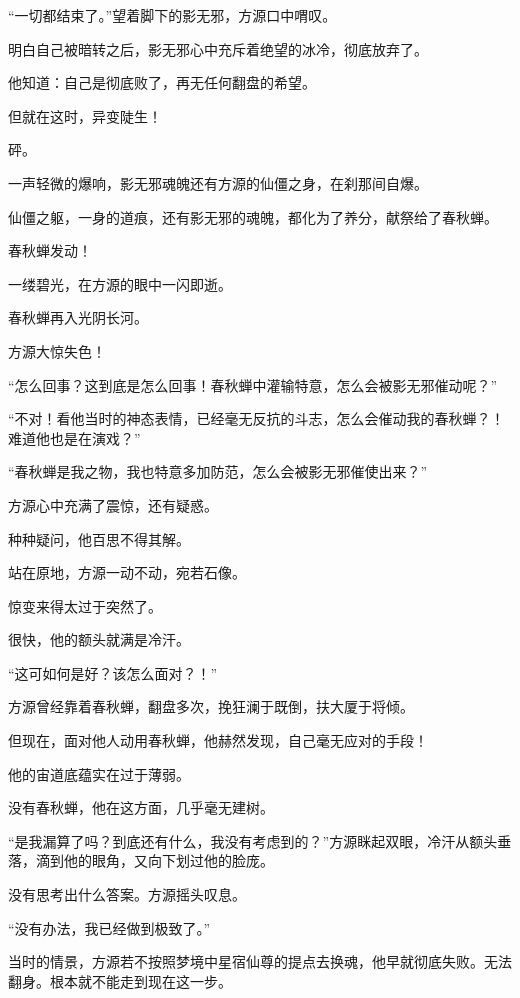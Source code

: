 
\begin{this_body}



“一切都结束了。”望着脚下的影无邪，方源口中喟叹。

明白自己被暗转之后，影无邪心中充斥着绝望的冰冷，彻底放弃了。

他知道：自己是彻底败了，再无任何翻盘的希望。

但就在这时，异变陡生！

砰。

一声轻微的爆响，影无邪魂魄还有方源的仙僵之身，在刹那间自爆。

仙僵之躯，一身的道痕，还有影无邪的魂魄，都化为了养分，献祭给了春秋蝉。

春秋蝉发动！

一缕碧光，在方源的眼中一闪即逝。

春秋蝉再入光阴长河。

方源大惊失色！

“怎么回事？这到底是怎么回事！春秋蝉中灌输特意，怎么会被影无邪催动呢？”

“不对！看他当时的神态表情，已经毫无反抗的斗志，怎么会催动我的春秋蝉？！难道他也是在演戏？”

“春秋蝉是我之物，我也特意多加防范，怎么会被影无邪催使出来？”

方源心中充满了震惊，还有疑惑。

种种疑问，他百思不得其解。

站在原地，方源一动不动，宛若石像。

惊变来得太过于突然了。

很快，他的额头就满是冷汗。

“这可如何是好？该怎么面对？！”

方源曾经靠着春秋蝉，翻盘多次，挽狂澜于既倒，扶大厦于将倾。

但现在，面对他人动用春秋蝉，他赫然发现，自己毫无应对的手段！

他的宙道底蕴实在过于薄弱。

没有春秋蝉，他在这方面，几乎毫无建树。

“是我漏算了吗？到底还有什么，我没有考虑到的？”方源眯起双眼，冷汗从额头垂落，滴到他的眼角，又向下划过他的脸庞。

没有思考出什么答案。方源摇头叹息。

“没有办法，我已经做到极致了。”

当时的情景，方源若不按照梦境中星宿仙尊的提点去换魂，他早就彻底失败。无法翻身。根本就不能走到现在这一步。


\end{this_body}

